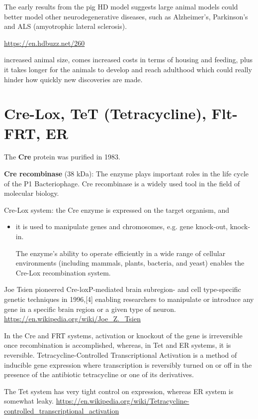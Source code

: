 The early results from the pig HD model  suggests large animal models could
better model other neurodegenerative diseases, such as Alzheimer's, Parkinson's and ALS
(amyotrophic lateral sclerosis).


\url{https://en.hdbuzz.net/260}

increased animal size, comes increased costs in terms of housing and feeding,
plus it takes longer for the animals to develop and reach adulthood which could
really hinder how quickly new discoveries are made. 



\section{Cre-Lox, TeT (Tetracycline), Flt-FRT, ER}
\label{sec:Cre-Lox}
\label{sec:Tet-system}
\label{sec:Flt-FRT}

The {\bf Cre} protein was purified in 1983.

{\bf Cre recombinase} (38 kDa): The enzyme plays important roles in the life
cycle of the P1 Bacteriophage. Cre recombinase is a widely used tool in the
field of molecular biology.

Cre-Lox system: the Cre enzyme is expressed on the target organism, and 
\begin{itemize}
  \item  it is used to manipulate genes and chromosomes, e.g. gene knock-out,
  knock-in. 
  
  The enzyme's ability to operate efficiently in a wide range of cellular
  environments (including mammals, plants, bacteria, and yeast) enables the
  Cre-Lox recombination system.
\end{itemize}
Joe Tsien pioneered Cre-loxP-mediated brain subregion- and cell type-specific
genetic techniques in 1996,[4] enabling researchers to manipulate or introduce
any gene in a specific brain region or a given type of neuron. 
\url{https://en.wikipedia.org/wiki/Joe_Z._Tsien}

In the Cre and FRT systems, activation or knockout of the gene is irreversible
once recombination is accomplished, whereas, in Tet and ER systems, it is reversible.
Tetracycline-Controlled Transcriptional Activation is a method of inducible gene
expression where transcription is reversibly turned on or off in the presence of
the antibiotic tetracycline or one of its derivatives.

The Tet system has very tight control on expression, whereas ER system is
somewhat leaky.
\url{https://en.wikipedia.org/wiki/Tetracycline-controlled_transcriptional_activation}

